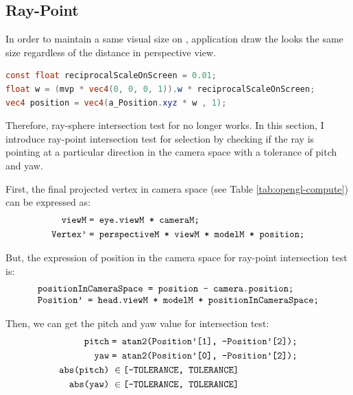 \subsection{Ray-Point}
\label{section:ray-point}

In order to maintain a same visual size on , application draw the  looks the same size regardless of the distance in perspective view.

\begin{lstlisting}[language=Glsl]
const float reciprocalScaleOnScreen = 0.01;
float w = (mvp * vec4(0, 0, 0, 1)).w * reciprocalScaleOnScreen;
vec4 position = vec4(a_Position.xyz * w , 1);
\end{lstlisting}

Therefore, ray-sphere intersection test for  no longer works. In this section, I introduce ray-point intersection test for  selection by checking if the ray is pointing at a particular direction in the camera space with a tolerance of pitch and yaw. 

First, the final projected vertex in camera space (see Table \ref{tab:opengl-compute}) can be expressed as:
\[
\begin{array}{lr}
\begin{aligned}
\texttt{viewM}\;&\texttt{= eye.viewM * cameraM;}\\
\texttt{Vertex'}\;&\texttt{= perspectiveM * viewM * modelM * position;}\\
\end{aligned}
\end{array}
\]

But, the expression of position in the camera space for ray-point intersection test is:
\[
\begin{array}{lr}
\texttt{positionInCameraSpace = position - camera.position;}\\
\texttt{Position' = head.viewM * modelM * positionInCameraSpace;}\\
\end{array}
\]

Then, we can get the pitch and yaw value for intersection test:
\[
\begin{array}{lr}
\begin{aligned}
\texttt{pitch}\;&\texttt{= atan2(Position'[1], -Position'[2]);}\\
\texttt{yaw}\;&\texttt{= atan2(Position'[0], -Position'[2]);}\\
\texttt{abs(pitch)}\;&\in \texttt{[-TOLERANCE, TOLERANCE]}\\
\texttt{abs(yaw)}\;&\in \texttt{[-TOLERANCE, TOLERANCE]}\\
\end{aligned}
\end{array}
\]

